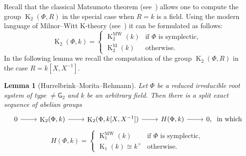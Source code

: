 \documentclass[oneside, 8pt]{amsart}
\newtheorem{lemma}{Lemma}
\theoremstyle{remark}
\theoremstyle{definition}
\numberwithin{lemma}{section}
\numberwithin{prop}{section}
\numberwithin{corollary}{section}
\numberwithin{externaltheorem}{section}
\DeclareMathOperator{\K}{K}
\newcommand{\inv}{^{-1}}
\newcommand{\rG}{\mathsf{G}}
\numberwithin{equation}{section}
\begin{document}
Recall that the classical Matsumoto theorem (see~\cite[Theorem~5.10]{Ma69}) allows one to compute the group $\K_2(\Phi, R)$ in the special case when $R=k$ is a field.
Using the modern language of Milnor--Witt K-theory (see~\cite{Mo04}) it can be formulated as follows:
\begin{equation*} \K_2(\Phi, k) = \left\{\begin{array}{ll} \K_2^\mathrm{MW}(k)& \text{if $\Phi$ is symplectic,}\\ \K_2^\mathrm{M}(k) & \text{otherwise.}\end{array}\right. \end{equation*}
In the following lemma we recall the computation of the group $\K_2(\Phi, R)$ in the case $R=k[X, X\inv]$.
\begin{lemma}[Hurrelbrink--Morita--Rehmann]\label{K2-laurent-field} Let $\Phi$ be a reduced irreducible root system of type $\neq \rG_2$ and $k$ be an arbitrary field. Then there is a split exact sequence of abelian groups
\[\begin{tikzcd} 0 \arrow{r} & \K_2(\Phi, k) \arrow{r} & \K_2(\Phi, k[X, X^{-1}]) \arrow{r} & H(\Phi, k) \arrow{r} & 0, \end{tikzcd}\text{ in which}\]
\[ H(\Phi, k) = \left\{\begin{array}{ll} \K_1^\mathrm{MW}(k)& \text{if $\Phi$ is symplectic,}\\ \K_1(k) \cong k^\times & \text{otherwise.}  \end{array}\right. \]  \end{lemma}
\end{document}
